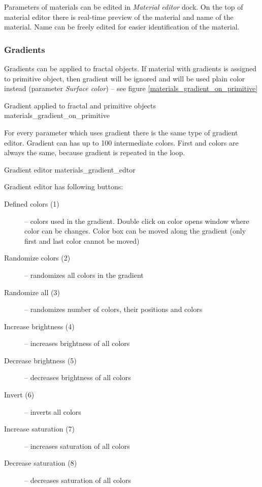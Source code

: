 Parameters of materials can be edited in \emph{Material editor} dock. On the top of material editor there is real-time preview of the material and name of the material. Name can be freely edited for easier identification of the material.

\subsubsection{Gradients}\label{materials-gradients}

Gradients can be applied to fractal objects. If material with gradients is assigned to primitive object, then gradient will be ignored and will be used plain color instead (parameter \emph{Surface color}) -- see figure \ref{materials_gradient_on_primitive}

{Gradient applied to fractal and primitive objects}
{materials_gradient_on_primitive}

For every parameter which uses gradient there is the same type of gradient editor. Gradient can has up to 100 intermediate colors. First and colors are always the same, because gradient is repeated in the loop.

{Gradient editor}
{materials_gradient_edtor}

Gradient editor has following buttons:
\nopagebreak
\begin{description}
	\item[Defined colors (1)] -- colors used in the gradient. Double click on color opens window where color can be changes. Color box can be moved along the gradient (only first and last color cannot be moved) 
	\item[Randomize colors (2)] -- randomizes all colors in the gradient
	\item[Randomize all (3)] -- randomizes number of colors, their positions and colors
	\item[Increase brightness (4)] -- increases brightness of all colors
	\item[Decrease brightness (5)] -- decreases brightness of all colors
	\item[Invert (6)] -- inverts all colors
	\item[Increase saturation (7)] -- increases saturation of all colors
	\item[Decrease saturation (8)] -- decreases saturation of all colors
\end{description}

